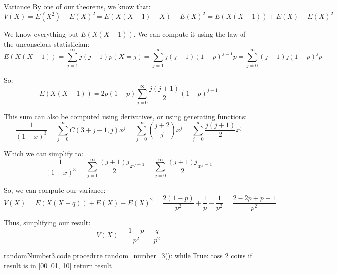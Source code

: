 \documentclass[a4paper]{article}
\begin{document}
\begin{parag}{Variance}
    By one of our theorems, we know that: 
    \[V\left(X\right) = E\left(X^2\right) - E\left(X\right)^2 = E\left(X\left(X - 1\right) + X\right) - E\left(X\right)^2 = E\left(X\left(X - 1\right)\right) + E\left(X\right) - E\left(X\right)^2\]

    We know everything but $E\left(X\left(X - 1\right)\right)$. We can compute it using the law of the unconscious statistician:
    \[E\left(X\left(X - 1\right)\right) = \sum_{j=1}^{\infty} j\left(j-1\right)p\left(X = j\right) = \sum_{j=1}^{\infty} j\left(j-1\right)\left(1 - p\right)^{j-1}p = \sum_{j = 0}^{\infty} \left(j+1\right)j\left(1-p\right)^j p\]

    So: 
    \[E\left(X\left(X - 1\right)\right) = 2p\left(1-p\right) \sum_{j=0}^{\infty} \frac{j\left(j+1\right)}{2}\left(1 - p\right)^{j-1}\]
    
    
    This sum can also be computed using derivatives, or using generating functions:
    \[\frac{1}{\left(1 - x\right)^3} = \sum_{j=0}^{\infty} C\left(3 + j - 1, j\right) x^j = \sum_{j=0}^{\infty} \binom{j+2}{j}x^j = \sum_{j=0}^{\infty} \frac{j\left(j+1\right)}{2} x^j\]

    Which we can simplify to:
    \[\frac{1}{\left(1 - x\right)^3} = \sum_{j=1}^{\infty} \frac{\left(j+1\right)j}{2} x^{j-1} = \sum_{j=0}^{\infty} \frac{\left(j+1\right)j}{2}x^{j-1}\]

    So, we can compute our variance: 
    \[V\left(X\right) = E\left(X\left(X-q\right)\right) + E\left(X\right) - E\left(X\right)^2 = \frac{2\left(1 - p\right)}{p^2} + \frac{1}{p} - \frac{1}{p^2} = \frac{2 - 2p + p -1 }{p^2}\]
    
    Thus, simplifying our result: 
    \[V\left(X\right) = \frac{1 - p}{p^2} = \frac{q}{p^2}\]
    
\end{parag}

\begin{filecontents*}[overwrite]{randomNumber3.code}
procedure random_number_3():
    while True:
        toss 2 coins
        if result is in [00, 01, 10]
            return result
\end{filecontents*}
\end{document}
